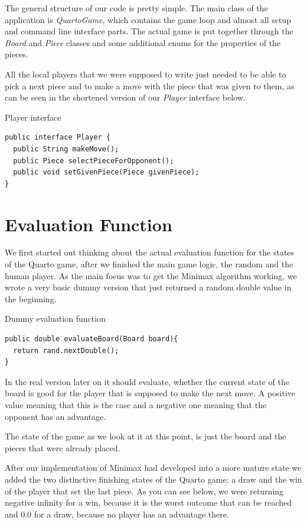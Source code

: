\documentclass{scrartcl}
\begin{document}
The general structure of our code is pretty simple. The main class of the application is \textit{QuartoGame}, which contains the game loop and almost all setup and command line interface parts. The actual game is put together through the \textit{Board} and \textit{Piece} classes and some additional enums for the properties of the pieces.

All the local players that we were supposed to write just needed to be able to pick a next piece and to make a move with the piece that was given to them, as can be seen in the shortened version of our \textit{Player} interface below.

\begin{listing}[H]
\caption{Player interface}
\begin{verbatim}
public interface Player {
  public String makeMove();
  public Piece selectPieceForOpponent();
  public void setGivenPiece(Piece givenPiece);
}
\end{verbatim}
\end{listing}

\section{Evaluation Function}

We first started out thinking about the actual evaluation function for the states of the Quarto game, after we finished the main game logic, the random and the human player. As the main focus was to get the Minimax algorithm working, we wrote a very basic dummy version that just returned a random double value in the beginning.

\begin{listing}[H]
\caption{Dummy evaluation function}
\begin{verbatim}
public double evaluateBoard(Board board){
  return rand.nextDouble();
}
\end{verbatim}
\end{listing}

In the real version later on it should evaluate, whether the current state of the board is good for the player that is supposed to make the next move. A positive value meaning that this is the case and a negative one meaning that the opponent has an advantage.

The state of the game as we look at it at this point, is just the board and the pieces that were already placed.

After our implementation of Minimax had developed into a more mature state we added the two distinctive finishing states of the Quarto game: a draw and the win of the player that set the last piece. As you can see below, we were returning negative infinity for a win, because it is the worst outcome that can be reached and 0.0 for a draw, because no player has an advantage there.
\end{document}
